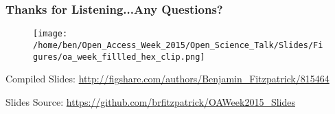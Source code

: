\documentclass[xcolor=dvipsnames]{beamer}
\begin{document}
\begin{frame}
\frametitle{Thanks for Listening...Any Questions?}
\begin{center}
\begin{figure}
\texttt{[image: /home/ben/Open\_Access\_Week\_2015/Open\_Science\_Talk/Slides/Figures/oa\_week\_fillled\_hex\_clip.png]}
\end{figure}
\end{center}
\end{frame}

\begin{frame}
\begin{block}{Compiled Slides:}
\small \url{http://figshare.com/authors/Benjamin_Fitzpatrick/815464}
\end{block}

\begin{block}{Slides Source:}
\small \url{https://github.com/brfitzpatrick/OAWeek2015_Slides}
\end{block}
\end{frame}
\end{document}
